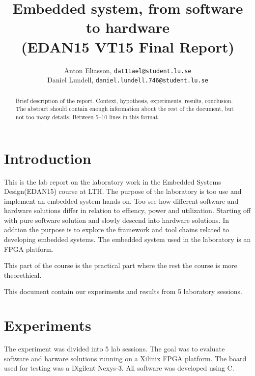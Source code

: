 \documentclass[11pt]{article}
\title{Embedded system, from software to hardware\\\small{(EDAN15 VT15 Final Report)}}
\author{
Anton Eliasson, \texttt{dat11ael@student.lu.se}\\
Daniel Lundell, \texttt{daniel.lundell.746@student.lu.se}
}
\begin{document}
\lstset{
	language=C,
	captionpos=b,
	basicstyle=\footnotesize\ttfamily
}

\maketitle

\begin{abstract}
Brief description of the report. Context, hypothesis, experiments, results, conclusion. The abstract should contain enough
information about the rest of the document, but not too many details. Between 5--10 lines in this format.
\end{abstract}
\section{Introduction}
This is the lab report on the laboratory work in the Embedded Systems Design(EDAN15) course at LTH. The purpose of the laboratory is too use and implement an embedded system hands-on. Too see how different software and hardware solutions differ in relation to effiency, power and utilization. Starting off with pure software solution and slowly descend into hardware solutions. In addtion the purpose is to explore the framework and tool chains related to developing embedded systems. The embedded system used in the laboratory is an FPGA platform.

This part of the course is the practical part where the rest the course is more theorethical.

This document contain our experiments and results from 5 laboratory sessions.



\section{Experiments}\label{sec:exp}
The experiment was divided into 5 lab sessions. The goal was to evaluate software and harware solutions running on a Xilinix FPGA platform. The board used for testing was a Digilent Nexys-3. All software was developed using C.  
\end{document}
